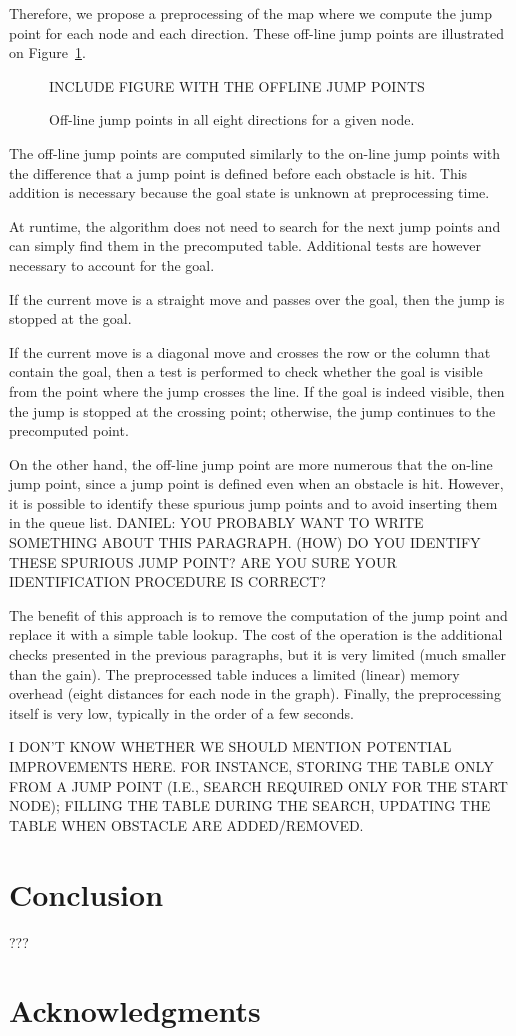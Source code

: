 \documentclass{article}
\begin{document}
Therefore, we propose a preprocessing of the map 
where we compute the jump point 
for each node and each direction.  
These off-line jump points are illustrated on Figure~\ref{fig::ojp}.  

\begin{figure}[ht]
  INCLUDE FIGURE WITH THE OFFLINE JUMP POINTS
  \caption{Off-line jump points in all eight directions for a given node.}
  \label{fig::ojp}
\end{figure}

The off-line jump points are computed similarly to the on-line jump points 
with the difference that a jump point is defined before each obstacle is hit.  
This addition is necessary 
because the goal state is unknown at preprocessing time.  

At runtime, the algorithm does not need to search for the next jump points 
and can simply find them in the precomputed table.  
Additional tests are however necessary to account for the goal.  

If the current move is a straight move 
and passes over the goal, 
then the jump is stopped at the goal.  

If the current move is a diagonal move 
and crosses the row or the column that contain the goal, 
then a test is performed to check 
whether the goal is visible from the point 
where the jump crosses the line.  
If the goal is indeed visible, 
then the jump is stopped at the crossing point; 
otherwise, the jump continues to the precomputed point.  

On the other hand, the off-line jump point are more numerous 
that the on-line jump point, 
since a jump point is defined even when an obstacle is hit.  
However, it is possible to identify these spurious jump points 
and to avoid inserting them in the queue list.  
DANIEL: YOU PROBABLY WANT TO WRITE SOMETHING ABOUT THIS PARAGRAPH.  
(HOW) DO YOU IDENTIFY THESE SPURIOUS JUMP POINT?  
ARE YOU SURE YOUR IDENTIFICATION PROCEDURE IS CORRECT?  

The benefit of this approach is to remove the computation of the jump point 
and replace it with a simple table lookup.  
The cost of the operation is the additional checks 
presented in the previous paragraphs, 
but it is very limited (much smaller than the gain).  
The preprocessed table induces a limited (linear) memory overhead 
(eight distances for each node in the graph).  
Finally, the preprocessing itself is very low, 
typically in the order of a few seconds.  

I DON'T KNOW WHETHER WE SHOULD MENTION POTENTIAL IMPROVEMENTS HERE.  
FOR INSTANCE, STORING THE TABLE ONLY FROM A JUMP POINT 
(I.E., SEARCH REQUIRED ONLY FOR THE START NODE); 
FILLING THE TABLE DURING THE SEARCH, 
UPDATING THE TABLE WHEN OBSTACLE ARE ADDED/REMOVED.  

\section{Conclusion}

???

\section*{Acknowledgments}




\end{document}
